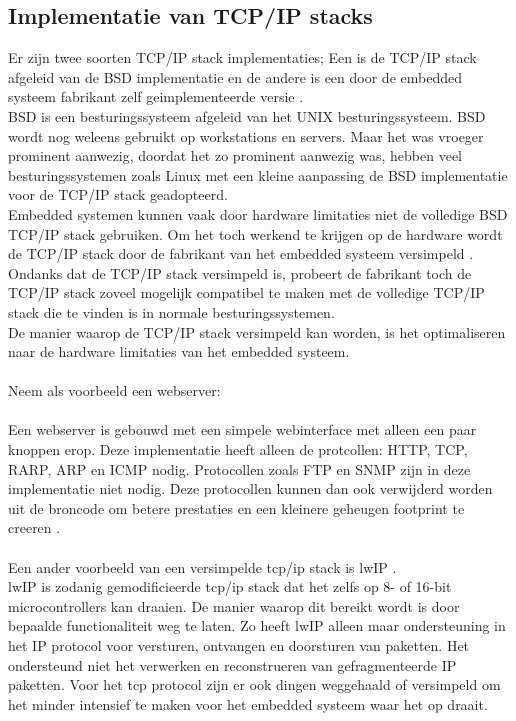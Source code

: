 \documentclass[../DCM2_Verslag.tex]{subfiles}
\begin{document}
\subsection{Implementatie van TCP/IP stacks}
Er zijn twee soorten TCP/IP stack implementaties; Een is de TCP/IP stack afgeleid van de BSD implementatie \parencite{mckboskarqua} en de andere is een door de embedded systeem fabrikant zelf geimplementeerde versie \parencite{dunkels}.\\
BSD is een besturingssysteem afgeleid van het UNIX besturingssysteem. BSD wordt nog weleens gebruikt op workstations en servers. Maar het was vroeger prominent aanwezig, doordat het zo prominent aanwezig was, hebben veel besturingssystemen zoals Linux met een kleine aanpassing de BSD implementatie voor de TCP/IP stack geadopteerd.
\\
Embedded systemen kunnen vaak door hardware limitaties niet de volledige BSD TCP/IP stack gebruiken. Om het toch werkend te krijgen op de hardware wordt de TCP/IP stack door de fabrikant van het embedded systeem versimpeld \parencite{wang}. Ondanks dat de TCP/IP stack versimpeld is, probeert de fabrikant toch de TCP/IP stack zoveel mogelijk compatibel te maken met de volledige TCP/IP stack die te vinden is in normale besturingssystemen. 
\\
De manier waarop de TCP/IP stack versimpeld kan worden, is het optimaliseren naar de hardware limitaties van het embedded systeem.
\\\\
Neem als voorbeeld een webserver:
\\\\
Een webserver is gebouwd met een simpele webinterface met alleen een paar knoppen erop. Deze implementatie heeft alleen de protcollen: HTTP, TCP, RARP, ARP en ICMP nodig. Protocollen zoals FTP en SNMP zijn in deze implementatie niet nodig. Deze protocollen kunnen dan ook verwijderd worden uit de broncode om betere prestaties en een kleinere geheugen footprint te creeren \parencite{wang}.
\\\\
Een ander voorbeeld van een versimpelde tcp/ip stack is lwIP \parencite{lwip}. \\lwIP is zodanig gemodificieerde tcp/ip stack dat het zelfs op 8- of 16-bit microcontrollers kan draaien. De manier waarop dit bereikt wordt is door bepaalde functionaliteit weg te laten. Zo heeft lwIP alleen maar ondersteuning in het IP protocol voor versturen, ontvangen en doorsturen van paketten. Het ondersteund niet het verwerken en reconstrueren van gefragmenteerde IP paketten. Voor het tcp protocol zijn er ook dingen weggehaald of versimpeld om het minder intensief te maken voor het embedded systeem waar het op draait. 
\end{document}
